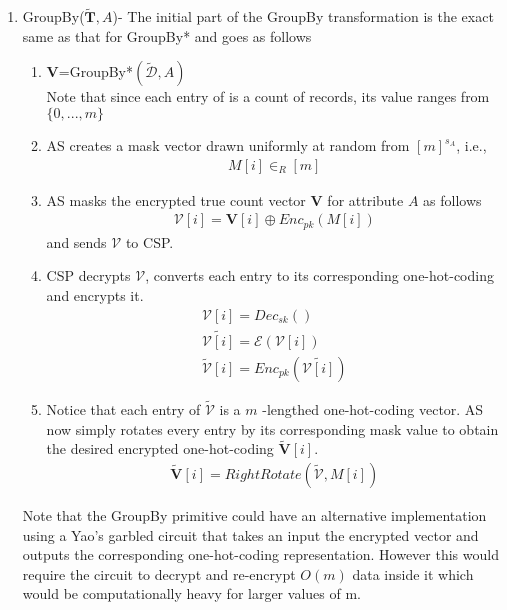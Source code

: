 \begin{enumerate}
\begin{enumerate} [label=(\alph*)]
\end{enumerate}
\item GroupBy($\mathbf{\tilde{T}},A$)- The initial part of the  GroupBy transformation is the exact same as that  for GroupBy* and goes as follows   \begin{enumerate}\item $\mathbf{V}$=GroupBy*$(\boldsymbol{\tilde{\mathcal{D}}},A)$ \\Note that since each entry of is a count of records, its value ranges from $\{0,...,m\}$\item AS creates a mask vector drawn uniformly at random from $[m]^{s_A}$, i.e.,  \begin{gather} M[i] \in_R [m]\end{gather} \item AS masks the encrypted true count vector $\mathbf{V}$ for attribute $A$ as follows \begin{gather}\boldsymbol{\mathcal{V}}[i]= \mathbf{V}[i] \oplus Enc_{pk}(M[i])\end{gather} and sends $\boldsymbol{\mathcal{V}}$ to CSP.\item CSP decrypts $\boldsymbol{\mathcal{V}}$, converts each entry to its corresponding one-hot-coding and encrypts it. \begin{gather*}\mathcal{V}[i]=Dec_{sk}(\boldsymbol{})\\\tilde{\mathcal{V}[i]}=\mathcal{E}(\mathcal{V}[i])\\\boldsymbol{\tilde{\mathcal{V}}}[i]=Enc_{pk}(\tilde{\mathcal{V}[i]})\end{gather*}\item Notice that each entry of $\boldsymbol{\tilde{\mathcal{V}}}$ is a $m$ -lengthed one-hot-coding vector. AS now simply rotates every entry by its corresponding mask value to obtain the desired  encrypted one-hot-coding $\boldsymbol{\tilde{V}}[i]$. \begin{gather}\boldsymbol{\tilde{V}}[i]=RightRotate(\boldsymbol{\tilde{\mathcal{V}}},M[i])\end{gather}  \end{enumerate} Note that the GroupBy primitive could have an alternative implementation using a Yao's garbled circuit that takes an input the encrypted vector and outputs the corresponding one-hot-coding representation. However this would require the circuit to decrypt and re-encrypt $O(m)$ data inside it which would be computationally heavy for larger values of m. 

\end{enumerate}
